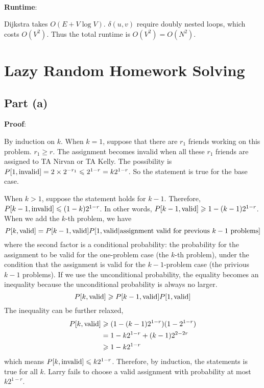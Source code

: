 \documentclass{article}
\begin{document}
~

\noindent\textbf{Runtime}:

Dijkstra takes $O(E+V\log V)$. $\delta(u,v)$ require doubly nested loops, which costs $O(V^2)$. Thus the total runtime is $O(V^2)=O(N^2)$.

\section{Lazy Random Homework Solving}
\subsection{Part (a)}
\noindent\textbf{Proof}:

By induction on $k$. When $k=1$, suppose that there are $r_1$ friends working on this problem. $r_1\geqslant r$. The assignment becomes invalid when all these $r_1$ friends are assigned to TA Nirvan or TA Kelly. The possibility is $P[1,\textup{invalid}]=2\times2^{-r_1}\leqslant 2^{1-r}=k2^{1-r}$. So the statement is true for the base case.

When $k>1$, suppose the statement holds for $k-1$. Therefore, $P[k-1,\textup{invalid}]\leqslant(1-k)2^{1-r}$. In other words, $P[k-1,\textup{valid}]\geqslant 1-(k-1)2^{1-r}$. When we add the $k$-th problem, we have
\begin{equation*}
	P[k,\textup{valid}]=P[k-1,\textup{valid}]P[1,\textup{valid}|\textup{assignment valid for previous $k-1$ problems}]
\end{equation*}
where the second factor is a conditional probability: the probability for the assignment to be valid for the one-problem case (the $k$-th problem), under the condition that the assignment is valid for the $k-1$-problem case (the privious $k-1$ problems). If we use the unconditional probability, the equality becomes an inequality because the unconditional probability is always no larger.
\begin{equation*}
	P[k,\textup{valid}]\geqslant P[k-1,\textup{valid}]P[1,\textup{valid}]
\end{equation*}
The inequality can be further relaxed,
\begin{align*}
	P[k,\textup{valid}]&\geqslant(1-(k-1)2^{1-r})(1-2^{1-r})\\
	&=1-k2^{1-r}+(k-1)2^{2-2r}\\
	&\geqslant1-k2^{1-r}
\end{align*}
which means $P[k,\textup{invalid}]\leqslant k2^{1-r}$. Therefore, by induction, the statements is true for all $k$. Larry fails to choose a valid assignment with probability at most $k2^{1-r}$.
\end{document}
